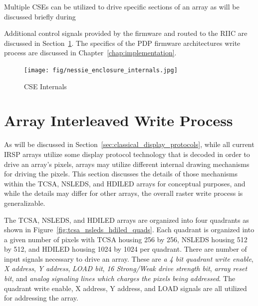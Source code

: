     Multiple CSEs can be utilized to drive specific sections of an array as will be discussed briefly during

    Additional control signals provided by the firmware and routed to the RIIC are discussed in Section~\ref{sec:array_Interleaved_write_process}. The specifics of the PDP firmware architectures write process are discussed in Chapter~\ref{chap:implementation}.

    \begin{figure}
        \centering
        \texttt{[image: fig/nessie\_enclosure\_internals.jpg]}
        \caption{CSE Internals}
        \label{fig:nessie_enclosure_internals}
    \end{figure}

\section{Array Interleaved Write Process}
    \label{sec:array_Interleaved_write_process}
    As will be discussed in Section~\ref{sec:classical_display_protocols}, while all current IRSP arrays utilize some display protocol technology that is decoded in order to drive an array's pixels, arrays may utilize different internal drawing mechanisms for driving the pixels. This section discusses the details of those mechanisms within the TCSA, NSLEDS, and HDILED arrays for conceptual purposes, and while the details may differ for other arrays, the overall raster write process is generalizable.

    The TCSA, NSLEDS, and HDILED arrays are organized into four quadrants as shown in Figure~\ref{fig:tcsa_nsleds_hdiled_quads}. Each quadrant is organized into a given number of pixels with TCSA housing 256 by 256, NSLEDS housing 512 by 512, and HDILED housing 1024 by 1024 per quadrant. There are number of input signals necessary to drive an array. These are {\em a 4 bit quadrant write enable}, {\em X address}, {\em Y address}, {\em LOAD bit}, {\em 16 Strong/Weak drive strength bit}, {\em array reset bit}, and {\em analog signaling lines which charges the pixels being addressed}. The quadrant write enable, X address, Y address, and LOAD signals are all utilized for addressing the array.


